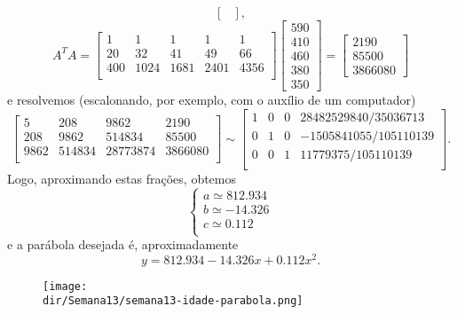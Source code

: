 \documentclass[../livro.tex]{subfiles}  %
\providecommand{\dir}{..}
\begin{document}
\begin{example}
\begin{equation}
\begin{bmatrix}
  \end{bmatrix},
  \end{equation}
  \begin{equation}
  A^T A =
  \begin{bmatrix}
    1 & 1 & 1 & 1 & 1 \\
    20 & 32 & 41 & 49 & 66 \\
    400 & 1024 & 1681 & 2401 & 4356 \\
  \end{bmatrix}
  \begin{bmatrix}
    590 \\ 410 \\ 460 \\ 380 \\ 350
  \end{bmatrix} =
  \begin{bmatrix}
    2190 \\ 85500 \\ 3866080
  \end{bmatrix}
  \end{equation} e resolvemos (escalonando, por exemplo, com o auxílio de um computador)
  \begin{equation}
  \begin{bmatrix}
    5 & 208 & 9862 & 2190 \\
    208 & 9862 & 514834 & 85500 \\
    9862 & 514834 & 28773874 & 3866080 \\
  \end{bmatrix} \sim
  \begin{bmatrix}
    1 & 0 & 0 & 28482529840/35036713 \\
    0 & 1 & 0 & -1505841055/105110139 \\
    0 & 0 & 1 & 11779375/105110139 \\
  \end{bmatrix}.
  \end{equation} Logo, aproximando estas frações, obtemos
  \begin{equation}
  \left\{
    \begin{array}{ll}
      a \simeq 812.934 \\
      b \simeq -14.326 \\
      c \simeq  0.112 \\
    \end{array}
  \right.
  \end{equation} e a parábola desejada é, aproximadamente
  \begin{equation}
  y = 812.934 - 14.326 x + 0.112 x^2.
  \end{equation}
  \begin{figure}[h!]
    \begin{center}
      \texttt{[image: \\dir/Semana13/semana13-idade-parabola.png]}
    \end{center}
  \end{figure}


\end{example}
\end{document}
